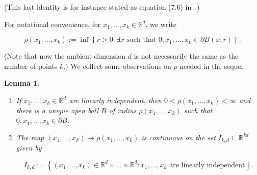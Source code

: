 \documentclass[11pt]{article}%
\newtheorem{lemma} [theorem] {Lemma}%
\newcommand{\eR}[0]{\ensuremath{ \mathbb R}}
\newcommand{\orig}{\underline{0}}
\begin{document}
\noindent
(This last identity is for instance stated as equation (7.6) in~\cite{SchneiderWeil}.)

For notational convenience, for $x_1,\dots,x_k \in\eR^d$, we write 

$$ \rho(x_1,\dots,x_k) := \inf\left\{ r > 0 : 
\text{$\exists x$ such that $\orig,x_1,\dots,x_k \in \partial B(x,r)$}\right\}. $$

\noindent
(Note that now the ambient dimension $d$ is not necessarily the same as the number of points $k$.)
We collect some observations on $\rho$ needed in the sequel.

\begin{lemma}\label{lem:rho}
\text{ }
\begin{enumerate}
 \item\label{itm:ballexist} If $x_1,\dots,x_k \in \eR^d$ are linearly independent, then $0<\rho(x_1,\dots,x_k)<\infty$ and
 there is a unique open ball $B$ of radius $\rho(x_1,\dots,x_k)$ such that $\orig,x_1,\dots,x_k \in \partial B$.
 \item\label{itm:rhocont} The map $(x_1,\dots,x_k) \mapsto \rho(x_1,\dots,x_k)$ is continuous on the 
 set $I_{k,d} \subseteq \eR^{kd}$ given by
 
 $$ I_{k,d} := \left\{  (x_1,\dots,x_k) \in \eR^d \times \dots\times\eR^d : x_1,\dots,x_k
 \text{ are linearly independent}\right\}. $$ 
 
\end{enumerate}
\end{lemma}
\end{document}
